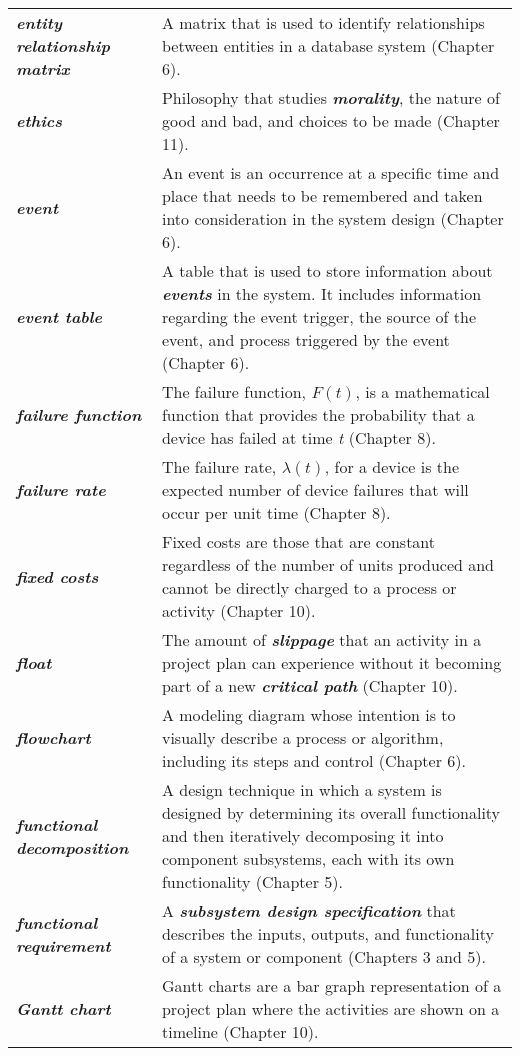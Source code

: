 \begin{longtable} { p{4cm} p{11cm}}
\emph{\textbf{entity relationship matrix}} & A matrix that is used to
identify relationships between entities in a database system (Chapter
6). \\
\emph{\textbf{ethics}} & Philosophy that studies
\emph{\textbf{morality}}, the nature of good and bad, and choices to be
made (Chapter 11). \\
\emph{\textbf{event}} & An event is an occurrence at a specific time and
place that needs to be remembered and taken into consideration in the
system design (Chapter 6). \\
\emph{\textbf{event table}} & A table that is used to store information
about \emph{\textbf{events}} in the system. It includes information
regarding the event trigger, the source of the event, and process
triggered by the event (Chapter 6). \\
\emph{\textbf{failure function}} & The failure function, $F(t)$, is
a mathematical function that provides the probability that a device has
failed at time \emph{t} (Chapter 8). \\
\emph{\textbf{failure rate}} & The failure rate, $\lambda(t)$, for a
device is the expected number of device failures that will occur per
unit time (Chapter 8). \\
\emph{\textbf{fixed costs}} & Fixed costs are those that are constant
regardless of the number of units produced and cannot be directly
charged to a process or activity (Chapter 10). \\
\emph{\textbf{float}} & The amount of \emph{\textbf{slippage}} that an
activity in a project plan can experience without it becoming part of a
new \emph{\textbf{critical path}} (Chapter 10). \\
\emph{\textbf{flowchart}} & A modeling diagram whose intention is to
visually describe a process or algorithm, including its steps and
control (Chapter 6). \\
\emph{\textbf{functional decomposition}} & A design technique in which a
system is designed by de­termining its overall functionality and then
iteratively decomposing it into component subsys­tems, each with its own
functionality (Chapter 5). \\
\emph{\textbf{functional requirement}} & A \emph{\textbf{subsystem
design specification}} that describes the inputs, outputs, and
functionality of a system or component (Chapters 3 and 5). \\
\emph{\textbf{Gantt chart}} & Gantt charts are a bar graph
representation of a project plan where the activities are shown on a
timeline (Chapter 10). \\

\end{longtable}
